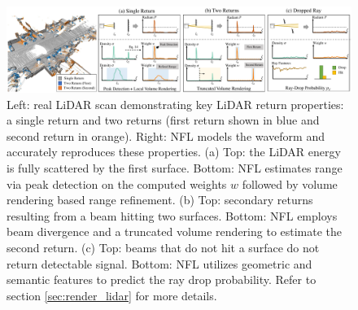 \begin{figure}[t]
\centering
\includegraphics[width=1.0\textwidth]{content/main/images/overview.pdf}
\caption{Left: real LiDAR scan demonstrating key LiDAR return properties: a \textcolor{mygray}{single return} and two returns (first return shown in \textcolor{myblue}{blue} and second return in \textcolor{myorange}{orange}). Right: NFL models the waveform and accurately reproduces these properties. (a) Top: the LiDAR energy is fully scattered by the first surface. Bottom: NFL estimates range via peak detection on the computed weights $w$ followed by volume rendering based range refinement. (b) Top: secondary returns resulting from a beam hitting two surfaces. Bottom: NFL employs beam divergence and a truncated volume rendering to estimate the second return. (c) Top: beams that do not hit a surface do not return detectable signal. Bottom: NFL utilizes geometric and semantic features to predict the ray drop probability. Refer to section \ref{sec:render_lidar} for more details. }
\label{fig:overview}
\end{figure}

